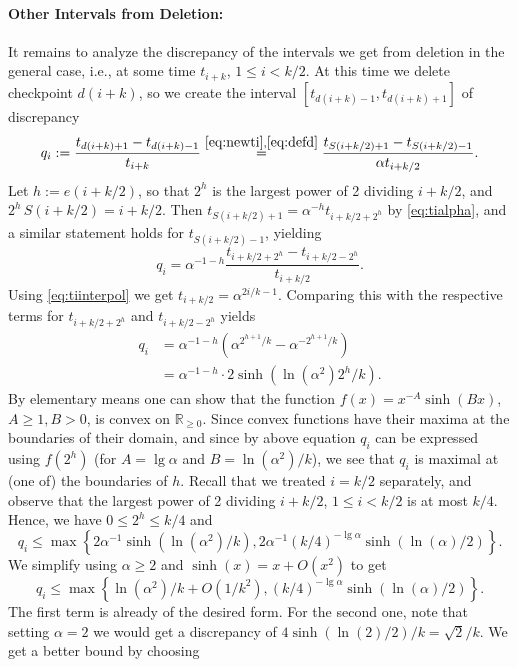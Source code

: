 {\paragraph{Other Intervals from Deletion:} 
It remains to analyze the discrepancy of the intervals we get from deletion in the general case, i.e., at some time $t_{i+k}$, $1 \le i < k/2$. At this time we delete checkpoint $d(i+k)$, so we create the interval $[t_{d(i+k)-1},t_{d(i+k)+1}]$ of discrepancy
\[
  q_i := \frac{ t_{d(i+k)+1} - t_{d(i+k)-1} }{ t_{i+k} }
  \stackrel{\eqref{eq:newti},\eqref{eq:defd}}{=} \frac{ t_{S(i+k/2)+1} - t_{S(i+k/2)-1} }{ \alpha t_{i+k/2} }.
\]
Let $h := e(i+k/2)$, so that $2^h$ is the largest power of 2 dividing $i+k/2$, and $2^h \,S(i+k/2) = i+k/2$. Then $t_{S(i+k/2)+1} = \alpha^{-h} t_{i+k/2+2^h}$ by \eqref{eq:tialpha}, and a similar statement holds for $t_{S(i+k/2)-1}$, yielding
\[
  q_i = \alpha^{-1-h} \frac{ t_{i+k/2+2^h} - t_{i+k/2-2^h} }{ t_{i+k/2} }.
\]
Using \eqref{eq:tiinterpol} we get $t_{i+k/2} = \alpha^{2i/k - 1}$. Comparing this with the respective terms for $t_{i+k/2+2^h}$ and $t_{i+k/2-2^h}$ yields
\begin{align*}
  q_i &= \alpha^{-1-h} \left(\alpha^{2^{h+1}/k} - \alpha^{-2^{h+1}/k}\right) \\
  &= \alpha^{-1-h} \cdot 2 \sinh \left( \ln \left(\alpha^2\right) 2^h / k \right).
\end{align*}
By elementary means one can show that the function $f(x) = x^{-A} \sinh(B x)$, $A \ge 1, B > 0$, is convex on $\mathbb{R}_{\ge 0}$. Since convex functions have their maxima at the boundaries of their domain, and since by above equation $q_i$ can be expressed using $f(2^h)$ (for $A = \lg \alpha$ and $B = \ln(\alpha^2)/k$), we see that $q_i$ is maximal at (one of) the boundaries of $h$. Recall that we treated $i=k/2$ separately, and observe that the largest power of 2 dividing $i+k/2$, $1 \le i < k/2$ is at most $k/4$. Hence, we have $0 \le 2^h \le k/4$ and 
\[
  q_i \le \max\left\{ 2 \alpha^{-1} \sinh(\ln(\alpha^2)/k), 2 \alpha^{-1} (k/4)^{-\lg \alpha} \sinh( \ln(\alpha)/2) \right\}.
\]
We simplify using $\alpha \ge 2$ and $\sinh(x) = x + O(x^2)$ to get
\begin{equation} \label{eq:jakubsqi}
  q_i \le \max\left\{ \ln(\alpha^2)/k + O(1/k^2), (k/4)^{-\lg \alpha} \sinh( \ln(\alpha)/2) \right\}.
\end{equation}
The first term is already of the desired form. For the second one, note that setting $\alpha = 2$ we would get a discrepancy of $4 \sinh(\ln(2)/2) / k = \sqrt{2}/k$. We get a better bound by choosing
}
